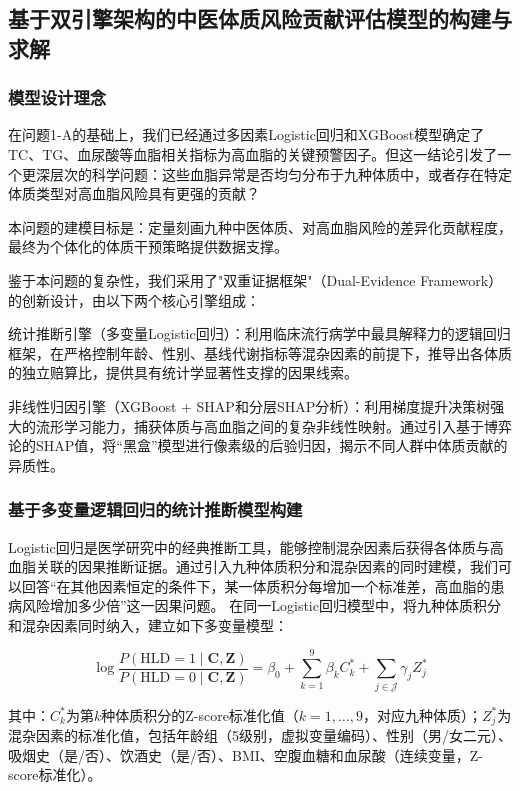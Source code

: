 \documentclass[12pt,a4paper]{ctexart}
\begin{document}
\subsection{基于双引擎架构的中医体质风险贡献评估模型的构建与求解}

\subsubsection{模型设计理念}

在问题1-A的基础上，我们已经通过多因素Logistic回归和XGBoost模型确定了TC、TG、血尿酸等血脂相关指标为高血脂的关键预警因子。但这一结论引发了一个更深层次的科学问题：这些血脂异常是否均匀分布于九种体质中，或者存在特定体质类型对高血脂风险具有更强的贡献？

本问题的建模目标是：定量刻画九种中医体质、对高血脂风险的差异化贡献程度，最终为个体化的体质干预策略提供数据支撑。

鉴于本问题的复杂性，我们采用了"双重证据框架"（Dual-Evidence Framework）的创新设计，由以下两个核心引擎组成：

统计推断引擎（多变量Logistic回归）：利用临床流行病学中最具解释力的逻辑回归框架，在严格控制年龄、性别、基线代谢指标等混杂因素的前提下，推导出各体质的独立赔算比，提供具有统计学显著性支撑的因果线索。

非线性归因引擎（XGBoost + SHAP和分层SHAP分析）：利用梯度提升决策树强大的流形学习能力，捕获体质与高血脂之间的复杂非线性映射。通过引入基于博弈论的SHAP值，将“黑盒”模型进行像素级的后验归因，揭示不同人群中体质贡献的异质性。

\subsubsection{基于多变量逻辑回归的统计推断模型构建}
Logistic回归是医学研究中的经典推断工具，能够控制混杂因素后获得各体质与高血脂关联的因果推断证据。通过引入九种体质积分和混杂因素的同时建模，我们可以回答“在其他因素恒定的条件下，某一体质积分每增加一个标准差，高血脂的患病风险增加多少倍”这一因果问题。
在同一Logistic回归模型中，将九种体质积分和混杂因素同时纳入，建立如下多变量模型：

\begin{equation}
\log\frac{P(\text{HLD}=1 \mid \mathbf{C}, \mathbf{Z})}{P(\text{HLD}=0 \mid \mathbf{C}, \mathbf{Z})} = \beta_0 + \sum_{k=1}^{9}\beta_k C_k^* + \sum_{j \in \mathcal{J}}\gamma_j Z_j^*
\label{eq:logit_constitution}
\end{equation}

其中：$C_k^*$为第$k$种体质积分的Z-score标准化值（$k = 1, \ldots, 9$，对应九种体质）；$Z_j^*$为混杂因素的标准化值，包括年龄组（5级别，虚拟变量编码）、性别（男/女二元）、吸烟史（是/否）、饮酒史（是/否）、BMI、空腹血糖和血尿酸（连续变量，Z-score标准化）。
\end{document}
